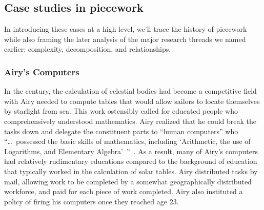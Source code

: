 \documentclass[trackingWork]{subfiles}
\begin{document}
\subsection{Case studies in piecework}
In introducing these cases at a high level,
we'll trace the history of piecework
while also framing the later analysis of the major research threads we named earlier: complexity, decomposition, and relationships.

\subsubsection{Airy's Computers}

\begin{comment}
What did I pull from the threads that are related to industrial and railroad workers (i.e. 1920 onward?)

- Airy and his human computers were great:
  - quickly verifiable
  - independent tasks (could be checked without the whole product)
  - narrowly trainable

\end{comment}

In the  century, the calculation of celestial bodies had become
a competitive field with 
Airy needed to compute tables that would
allow sailors to locate themselves by starlight from sea.
This work ostensibly called for educated people who comprehensively understood mathematics.
Airy realized that he could break the tasks down and delegate the constituent parts
to ``human computers'' who
``\dots~possessed the basic skills of mathematics,
including `Arithmetic, the use of Logarithms, and Elementary Algebra'~''~\cite{grier2013computers}.
As a result, many of Airy's computers had relatively rudimentary educations
compared to the background of education that typically worked in the calculation of solar tables.
Airy distributed tasks by mail,
allowing work to be completed by a somewhat geographically distributed workforce,
and paid for each piece of work completed.
Airy also instituted a policy of firing his computers once they reached age 23.
\end{document}

